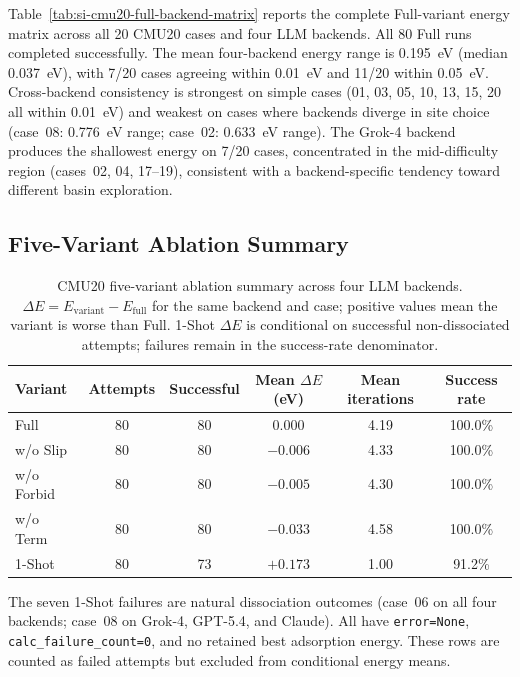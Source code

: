 \documentclass[%
 preprint,
 superscriptaddress,
 amsmath,amssymb,
 aps,
 prb,
 floatfix,
]{revtex4-2}
\begin{document}
Table~\ref{tab:si-cmu20-full-backend-matrix} reports the complete Full-variant energy matrix across all 20 CMU20 cases and four LLM backends. All 80 Full runs completed successfully. The mean four-backend energy range is 0.195~eV (median 0.037~eV), with 7/20 cases agreeing within 0.01~eV and 11/20 within 0.05~eV. Cross-backend consistency is strongest on simple cases (01, 03, 05, 10, 13, 15, 20 all within 0.01~eV) and weakest on cases where backends diverge in site choice (case~08: 0.776~eV range; case~02: 0.633~eV range). The Grok-4 backend produces the shallowest energy on 7/20 cases, concentrated in the mid-difficulty region (cases~02, 04, 17--19), consistent with a backend-specific tendency toward different basin exploration.

\subsection{Five-Variant Ablation Summary}

\begin{table}[ht]
\centering
\caption{CMU20 five-variant ablation summary across four LLM backends. $\Delta E = E_{\mathrm{variant}} - E_{\mathrm{full}}$ for the same backend and case; positive values mean the variant is worse than Full. 1-Shot $\Delta E$ is conditional on successful non-dissociated attempts; failures remain in the success-rate denominator.}
\label{tab:si-cmu20-ablation-summary}
\begin{tabular}{lccccc}
\toprule
Variant & Attempts & Successful & Mean $\Delta E$ (eV) & Mean iterations & Success rate \\
\midrule
Full & 80 & 80 & 0.000 & 4.19 & 100.0\% \\
w/o Slip & 80 & 80 & $-0.006$ & 4.33 & 100.0\% \\
w/o Forbid & 80 & 80 & $-0.005$ & 4.30 & 100.0\% \\
w/o Term & 80 & 80 & $-0.033$ & 4.58 & 100.0\% \\
1-Shot & 80 & 73 & $+0.173$ & 1.00 & 91.2\% \\
\bottomrule
\end{tabular}
\end{table}

The seven 1-Shot failures are natural dissociation outcomes (case~06 on all four backends; case~08 on Grok-4, GPT-5.4, and Claude). All have \texttt{error=None}, \texttt{calc\_failure\_count=0}, and no retained best adsorption energy. These rows are counted as failed attempts but excluded from conditional energy means.
\end{document}
